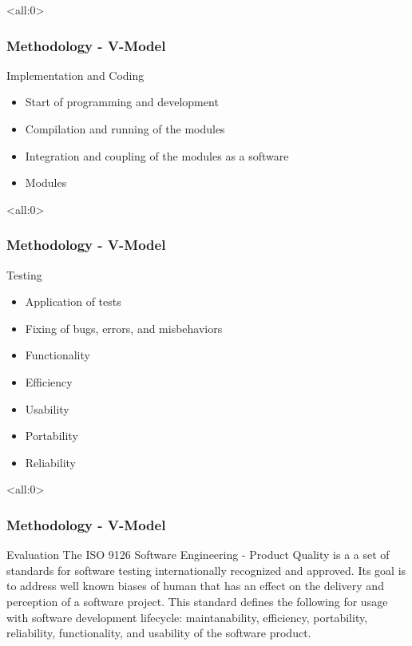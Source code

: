 \documentclass{beamer}
\begin{document}
\begin{frame}<all:0>
	\frametitle{Methodology - V-Model}
	\begin{block}{Implementation and Coding}
		\begin{itemize}
			\item<1-> Start of programming and development
			\item<2-> Compilation and running of the modules
			\item<3-> Integration and coupling of the modules as a software
		\end{itemize}

		\begin{itemize}
			\item<4-> Modules
		\end{itemize}
	\end{block}
\end{frame}

\begin{frame}<all:0>
	\frametitle{Methodology - V-Model}
	\begin{block}{Testing}
		\begin{itemize}
			\item<1-> Application of tests
			\item<2-> Fixing of bugs, errors, and misbehaviors
		\end{itemize}

		\begin{itemize}
			\item<3-> Functionality
			\item<4-> Efficiency
			\item<5-> Usability
			\item<6-> Portability
			\item<7-> Reliability
		\end{itemize}
	\end{block}
\end{frame}

\begin{frame}<all:0>
	\frametitle{Methodology - V-Model}
	\begin{block}{Evaluation}
		The ISO 9126 Software Engineering - Product Quality is a a set of standards for
		software testing internationally recognized and approved. Its goal is to
		address well known biases of human that has an effect on the delivery and
		perception of a software project. This standard defines the following for usage
		with software development lifecycle: maintanability, efficiency, portability,
		reliability, functionality, and usability of the software product.
	\end{block}
\end{frame}
\end{document}
